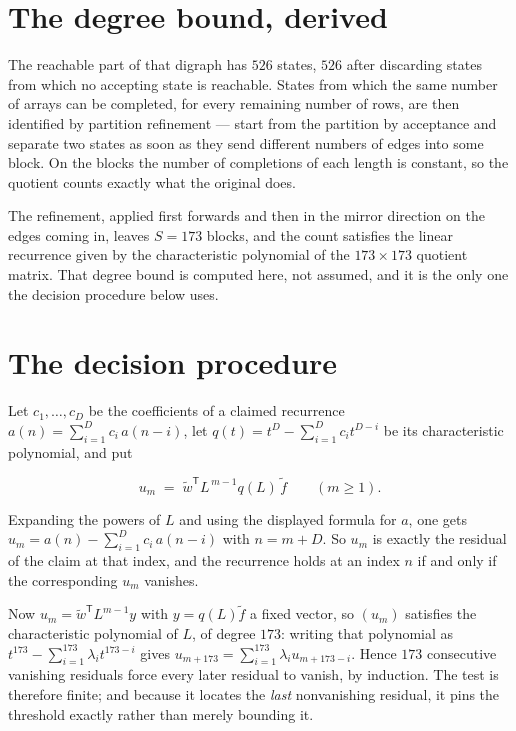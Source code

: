 \documentclass[11pt]{article}
\theoremstyle{definition}
\begin{document}
\section{The degree bound, derived}

The reachable part of that digraph has $526$ states, $526$ after discarding states from which no accepting state is reachable. States from which the same number of arrays can be completed, for every remaining number of rows, are then identified by partition refinement --- start from the partition by acceptance and separate two states as soon as they send different numbers of edges into some block. On the blocks the number of completions of each length is constant, so the quotient counts exactly what the original does.

The refinement, applied first forwards and then in the mirror direction on the edges coming in, leaves $S = 173$ blocks, and the count satisfies the linear recurrence given by the characteristic polynomial of the $173 \times 173$ quotient matrix. That degree bound is computed here, not assumed, and it is the only one the decision procedure below uses.

\section{The decision procedure}

Let $c_1,\dots,c_D$ be the coefficients of a claimed recurrence $a(n) = \sum_{i=1}^{D} c_i\,a(n-i)$, let $q(t) = t^{D} - \sum_{i=1}^{D} c_i t^{D-i}$ be its characteristic polynomial, and put

\[u_m \;=\; \tilde w^{\mathsf T} L^{\,m-1} q(L)\,\tilde f \qquad (m \ge 1).\]

Expanding the powers of $L$ and using the displayed formula for $a$, one gets $u_m = a(n) - \sum_{i=1}^{D} c_i\,a(n-i)$ with $n = m + D$. So $u_m$ is exactly the residual of the claim at that index, and the recurrence holds at an index $n$ if and only if the corresponding $u_m$ vanishes.

Now $u_m = \tilde w^{\mathsf T} L^{m-1} y$ with $y = q(L)\tilde f$ a fixed vector, so $(u_m)$ satisfies the characteristic polynomial of $L$, of degree $173$: writing that polynomial as $t^{173} - \sum_{i=1}^{173} \lambda_i t^{173-i}$ gives $u_{m+173} = \sum_{i=1}^{173} \lambda_i u_{m+173-i}$. Hence $173$ consecutive vanishing residuals force every later residual to vanish, by induction. The test is therefore finite; and because it locates the {\itshape last} nonvanishing residual, it pins the threshold exactly rather than merely bounding it.
\end{document}
